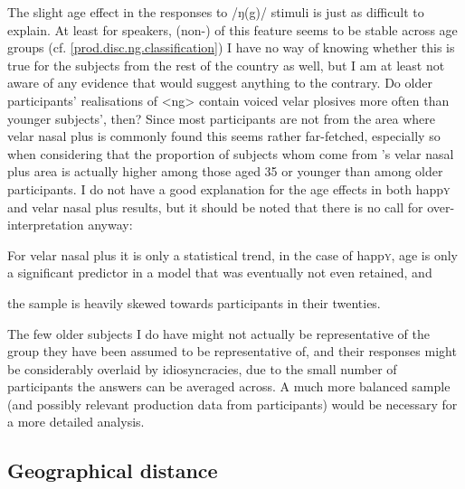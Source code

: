 The slight age effect in the responses to /ŋ(g)/ stimuli is just as difficult to explain.
At least for  speakers, (non-) of this feature seems to be stable across age groups (cf. \ref{prod.disc.ng.classification})
I have no way of knowing whether this is true for the subjects from the rest of the country as well, but I am at least not aware of any evidence that would suggest anything to the contrary.
Do older participants' realisations of <ng> contain voiced velar plosives more often than younger subjects', then?
Since most participants are not from the area where velar nasal plus is commonly found this seems rather far-fetched, especially so when considering that the proportion of subjects whom come from \citeauthor{trudgill1999}'s \citeyear{trudgill1999} velar nasal plus area is actually higher among those aged 35 or younger than among older participants.
I do not have a good explanation for the age effects in both happ\textsc{y} and velar nasal plus results, but it should be noted that there is no call for over-interpretation anyway:
	\begin{inparaenum}[(a)]
		\item For velar nasal plus it is only a statistical trend, in the case of happ\textsc{y}, age is only a significant predictor in a model that was eventually not even retained, and
		\item the sample is heavily skewed towards participants in their twenties.
	\end{inparaenum}
The few older subjects I do have might not actually be representative of the group they have been assumed to be representative of, and their responses might be considerably overlaid by idiosyncracies, due to the small number of participants the answers can be averaged across.
A much more balanced sample (and possibly relevant production data from participants) would be necessary for a more detailed analysis.

		\subsection{Geographical distance}

